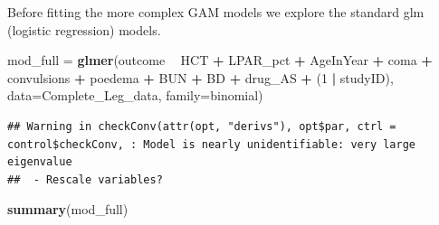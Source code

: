 \documentclass[]{article}
\newenvironment{Shaded}{\begin{snugshade}}{\end{snugshade}}
\newcommand{\KeywordTok}[1]{\textcolor[rgb]{0.13,0.29,0.53}{\textbf{#1}}}
\newcommand{\DataTypeTok}[1]{\textcolor[rgb]{0.13,0.29,0.53}{#1}}
\newcommand{\DecValTok}[1]{\textcolor[rgb]{0.00,0.00,0.81}{#1}}
\newcommand{\StringTok}[1]{\textcolor[rgb]{0.31,0.60,0.02}{#1}}
\newcommand{\OperatorTok}[1]{\textcolor[rgb]{0.81,0.36,0.00}{\textbf{#1}}}
\newcommand{\NormalTok}[1]{#1}
\begin{document}
Before fitting the more complex GAM models we explore the standard glm
(logistic regression) models.

\begin{Shaded}
\begin{Highlighting}[]
\NormalTok{mod_full =}\StringTok{ }\KeywordTok{glmer}\NormalTok{(outcome }\OperatorTok{~}\StringTok{ }\NormalTok{HCT }\OperatorTok{+}\StringTok{ }\NormalTok{LPAR_pct }\OperatorTok{+}\StringTok{ }\NormalTok{AgeInYear }\OperatorTok{+}\StringTok{ }\NormalTok{coma }\OperatorTok{+}\StringTok{ }\NormalTok{convulsions }\OperatorTok{+}
\StringTok{                   }\NormalTok{poedema }\OperatorTok{+}\StringTok{ }\NormalTok{BUN }\OperatorTok{+}\StringTok{ }\NormalTok{BD }\OperatorTok{+}\StringTok{ }\NormalTok{drug_AS }\OperatorTok{+}\StringTok{ }\NormalTok{(}\DecValTok{1} \OperatorTok{|}\StringTok{ }\NormalTok{studyID),}
               \DataTypeTok{data=}\NormalTok{Complete_Leg_data, }\DataTypeTok{family=}\NormalTok{binomial)}
\end{Highlighting}
\end{Shaded}

\begin{verbatim}
## Warning in checkConv(attr(opt, "derivs"), opt$par, ctrl = control$checkConv, : Model is nearly unidentifiable: very large eigenvalue
##  - Rescale variables?
\end{verbatim}

\begin{Shaded}
\begin{Highlighting}[]
\KeywordTok{summary}\NormalTok{(mod_full)}
\end{Highlighting}
\end{Shaded}
\end{document}
